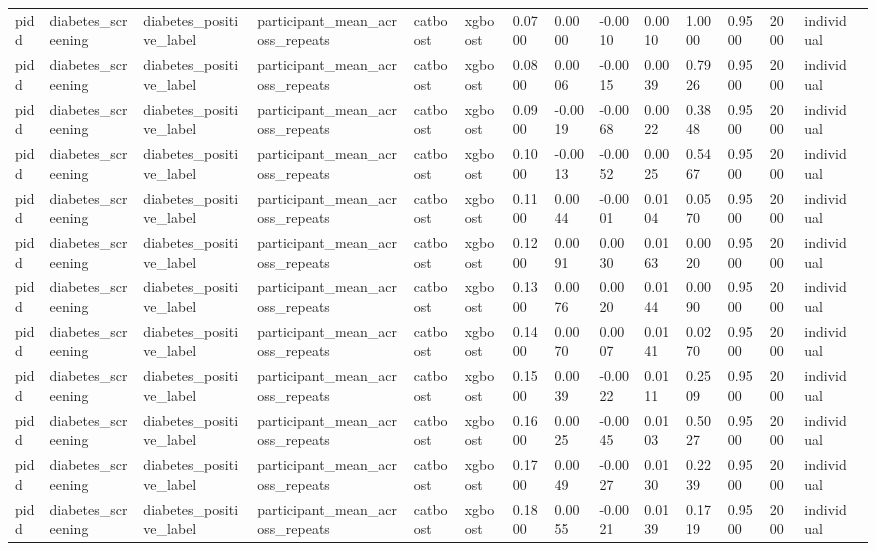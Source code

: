 \begin{tabular}{lllllllllllllll}
pidd & diabetes\_screening & diabetes\_positive\_label & participant\_mean\_across\_repeats & catboost & xgboost & 0.0700 & 0.0000 & -0.0010 & 0.0010 & 1.0000 & 0.9500 & 2000 & individual &  \\
pidd & diabetes\_screening & diabetes\_positive\_label & participant\_mean\_across\_repeats & catboost & xgboost & 0.0800 & 0.0006 & -0.0015 & 0.0039 & 0.7926 & 0.9500 & 2000 & individual &  \\
pidd & diabetes\_screening & diabetes\_positive\_label & participant\_mean\_across\_repeats & catboost & xgboost & 0.0900 & -0.0019 & -0.0068 & 0.0022 & 0.3848 & 0.9500 & 2000 & individual &  \\
pidd & diabetes\_screening & diabetes\_positive\_label & participant\_mean\_across\_repeats & catboost & xgboost & 0.1000 & -0.0013 & -0.0052 & 0.0025 & 0.5467 & 0.9500 & 2000 & individual &  \\
pidd & diabetes\_screening & diabetes\_positive\_label & participant\_mean\_across\_repeats & catboost & xgboost & 0.1100 & 0.0044 & -0.0001 & 0.0104 & 0.0570 & 0.9500 & 2000 & individual &  \\
pidd & diabetes\_screening & diabetes\_positive\_label & participant\_mean\_across\_repeats & catboost & xgboost & 0.1200 & 0.0091 & 0.0030 & 0.0163 & 0.0020 & 0.9500 & 2000 & individual &  \\
pidd & diabetes\_screening & diabetes\_positive\_label & participant\_mean\_across\_repeats & catboost & xgboost & 0.1300 & 0.0076 & 0.0020 & 0.0144 & 0.0090 & 0.9500 & 2000 & individual &  \\
pidd & diabetes\_screening & diabetes\_positive\_label & participant\_mean\_across\_repeats & catboost & xgboost & 0.1400 & 0.0070 & 0.0007 & 0.0141 & 0.0270 & 0.9500 & 2000 & individual &  \\
pidd & diabetes\_screening & diabetes\_positive\_label & participant\_mean\_across\_repeats & catboost & xgboost & 0.1500 & 0.0039 & -0.0022 & 0.0111 & 0.2509 & 0.9500 & 2000 & individual &  \\
pidd & diabetes\_screening & diabetes\_positive\_label & participant\_mean\_across\_repeats & catboost & xgboost & 0.1600 & 0.0025 & -0.0045 & 0.0103 & 0.5027 & 0.9500 & 2000 & individual &  \\
pidd & diabetes\_screening & diabetes\_positive\_label & participant\_mean\_across\_repeats & catboost & xgboost & 0.1700 & 0.0049 & -0.0027 & 0.0130 & 0.2239 & 0.9500 & 2000 & individual &  \\
pidd & diabetes\_screening & diabetes\_positive\_label & participant\_mean\_across\_repeats & catboost & xgboost & 0.1800 & 0.0055 & -0.0021 & 0.0139 & 0.1719 & 0.9500 & 2000 & individual &  \\

\end{tabular}
